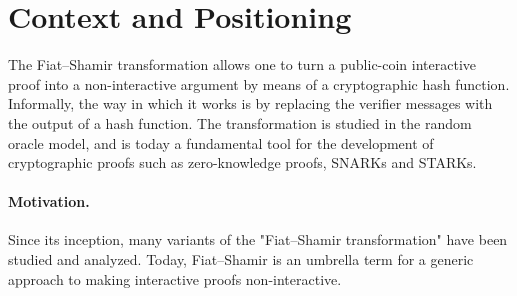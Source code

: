 \documentclass{article}
\begin{document}
\clearpage
\section{Context and Positioning}


The Fiat--Shamir transformation allows one to turn a public-coin interactive proof into a non-interactive argument by means of a cryptographic hash function.
Informally, the way in which it works is by replacing the verifier messages with the output of a hash function. The transformation is studied in the random oracle model, and is today a fundamental tool for the development of cryptographic proofs such as zero-knowledge proofs, SNARKs and STARKs.

\paragraph{Motivation.}
Since its inception, many variants of the "Fiat--Shamir transformation" have been studied and analyzed. Today, Fiat--Shamir is an umbrella term for a generic approach to making interactive proofs non-interactive.
\end{document}
